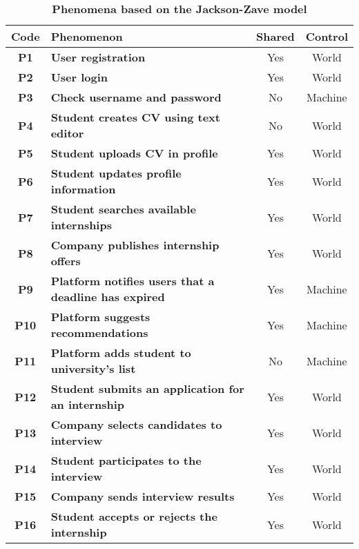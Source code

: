 \begin{table}[H]
    \caption*{\textbf{Phenomena based on the Jackson-Zave model}}
    \centering 
    \begin{tabular}{|c|p{24em}|c|c|}
    \hline
    \rowcolor{bluepoli!40} %
    \small\textbf{Code} & \small\textbf{Phenomenon} & \small\textbf{Shared} & \small\textbf{Control} \T\B \\
    \hline
    \small\textbf{P1} &\small \textbf{User registration} & Yes & World \T\B \\
    \small\textbf{P2} &\small \textbf{User login} & Yes & World \T\B\\
    \small\textbf{P3} &\small \textbf{Check username and password} & No & Machine \T\B\\
    \small\textbf{P4} &\small \textbf{Student creates CV using text editor} & No & World  \T\B \\
    \small\textbf{P5} &\small \textbf{Student uploads CV in profile} & Yes & World  \T\B \\
    \small\textbf{P6} &\small \textbf{Student updates profile information} & Yes & World  \T\B \\
    \small\textbf{P7} &\small \textbf{Student searches available internships} & Yes & World \T\B\\
    \small\textbf{P8} &\small \textbf{Company publishes internship offers} & Yes & World \T\B \\
    \small\textbf{P9} &\small \textbf{Platform notifies users that a deadline has expired} & Yes & Machine \B\\
    \small\textbf{P10} &\small \textbf{Platform suggests recommendations} & Yes & Machine \T\B \\
    \small\textbf{P11} &\small \textbf{Platform adds student to university's list} & No & Machine \T\B \\
    \small\textbf{P12} &\small \textbf{Student submits an application for an internship} & Yes & World \B\\
    \small\textbf{P13} &\small \textbf{Company selects candidates to interview} & Yes & World \T\B\\
    \small\textbf{P14} &\small \textbf{Student participates to the interview} & Yes & World \T\B \\
    \small\textbf{P15} &\small \textbf{Company sends interview results} & Yes & World \B\\
    \small\textbf{P16} &\small \textbf{Student accepts or rejects the internship} & Yes & World \T\B \\

\end{tabular}
\end{table}
